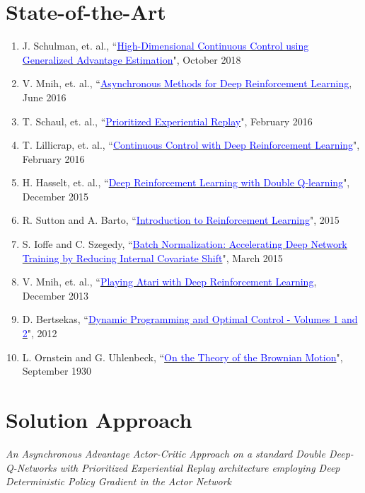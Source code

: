 \documentclass{article}
\begin{document}
\section{State-of-the-Art}
\begin{enumerate}
    \item J. Schulman, et. al., ``\href{https://arxiv.org/pdf/1506.02438.pdf}{\textcolor{blue}{High-Dimensional Continuous Control using Generalized Advantage Estimation}}", October 2018\label{1}
    \item V. Mnih, et. al.,
    ``\href{https://arxiv.org/pdf/1602.01783.pdf}{\textcolor{blue}{Asynchronous Methods for Deep Reinforcement Learning}}, June 2016\label{2}
    \item T. Schaul, et. al., ``\href{https://arxiv.org/pdf/1511.05952.pdf}{\textcolor{blue}{Prioritized Experiential Replay}}", February 2016\label{3}
    \item T. Lillicrap, et. al., ``\href{https://arxiv.org/pdf/1509.02971.pdf}{\textcolor{blue}{Continuous Control with Deep Reinforcement Learning}}", February 2016\label{4}
    \item H. Hasselt, et. al.,
    ``\href{https://arxiv.org/pdf/1509.06461.pdf}{\textcolor{blue}{Deep Reinforcement Learning with Double Q-learning}}", December 2015\label{5}
    \item R. Sutton and A. Barto,
    ``\href{https://web.stanford.edu/class/psych209/Readings/SuttonBartoIPRLBook2ndEd.pdf}{\textcolor{blue}{Introduction to Reinforcement Learning}}", 2015\label{6}
    \item S. Ioffe and C. Szegedy,
    ``\href{https://arxiv.org/pdf/1502.03167.pdf}{\textcolor{blue}{Batch Normalization: Accelerating Deep Network Training by Reducing Internal Covariate Shift}}", March 2015\label{7}
    \item V. Mnih, et. al.,
    ``\href{https://arxiv.org/pdf/1312.5602.pdf}{\textcolor{blue}{Playing Atari with Deep Reinforcement Learning}}, December 2013\label{8}
    \item D. Bertsekas, ``\href{http://web.mit.edu/dimitrib/www/dpchapter.html}{\textcolor{blue}{Dynamic Programming and Optimal Control - Volumes 1 and 2}}", 2012\label{9}
    \item L. Ornstein and G. Uhlenbeck,
    ``\href{https://journals.aps.org/pr/abstract/10.1103/PhysRev.36.823}{\textcolor{blue}{On the Theory of the Brownian Motion}}", September 1930\label{10}
\end{enumerate}
\section{Solution Approach}
\textit{An Asynchronous Advantage Actor-Critic Approach on a standard Double Deep-Q-Networks with Prioritized Experiential Replay architecture employing Deep Deterministic Policy Gradient in the Actor Network}
\end{document}
